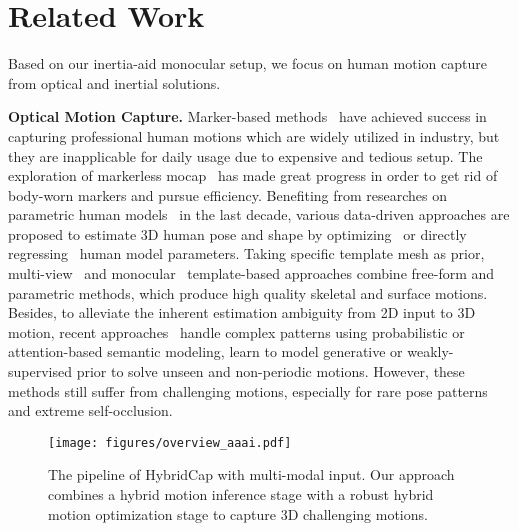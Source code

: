\documentclass[letterpaper]{article} \usepackage{aaai23}  \usepackage{times}  \usepackage{helvet}  \usepackage{courier}  \usepackage[hyphens]{url}  \usepackage{graphicx} \urlstyle{rm} \def\UrlFont{\rm}  \usepackage{natbib}  \usepackage{caption} \frenchspacing  \setlength{\pdfpagewidth}{8.5in}  \setlength{\pdfpageheight}{11in}  \usepackage{algorithm}
\newcommand{\myparagraph}[1]{\vspace{0.1em}\noindent\textbf{#1}}
\begin{document}
 \section{Related Work}


Based on our inertia-aid monocular setup, we focus on human motion capture from optical and inertial solutions.


\myparagraph{Optical Motion Capture.}
Marker-based methods~\cite{VICON,Vlasic2007} have achieved success in capturing professional human motions which are widely utilized in industry, but they are inapplicable for daily usage due to expensive and tedious setup. 
The exploration of markerless mocap~\cite{BreglM1998,AguiaSTAST2008,TheobASST2010} has made great progress in order to get rid of body-worn markers and pursue efficiency.
Benefiting from researches on parametric human models~\cite{SCAPE2005,SMPL2015,SMPLX2019,STAR_ECCV2020} in the last decade, various data-driven approaches are proposed to estimate 3D human pose and shape by optimizing~\cite{TAM_3DV2017,Lassner17,keepitSMPL,Kolotouros_2019_CVPR} or directly regressing~\cite{HMR18,Kanazawa_2019CVPR,VIBE_CVPR2020,zanfir2020neural} human model parameters. 
Taking specific template mesh as prior, multi-view~\cite{Gall2010,StollHGST2011,liu2013markerless,Robertini:2016,Pavlakos17,Simon17,FlyCap} and monocular~\cite{MonoPerfCap,LiveCap2019tog,EventCap_CVPR2020,DeepCap_CVPR2020} template-based approaches combine free-form and parametric methods, which produce high quality skeletal and surface motions.
Besides, to alleviate the inherent estimation ambiguity from 2D input to 3D motion, recent approaches~\cite{PHMR_ICCV2021,PARE_ICCV2021} handle complex patterns using probabilistic or attention-based semantic modeling, \cite{HUMOR_ICCV2021,challencap} learn to model generative or weakly-supervised prior to solve unseen and non-periodic motions. 
However, these methods still suffer from challenging motions, especially for rare pose patterns and extreme self-occlusion.



\begin{figure*}[t]
	\centering
	\texttt{[image: figures/overview\_aaai.pdf]}
	\caption{The pipeline of HybridCap with multi-modal input. Our approach combines a hybrid motion inference stage with a robust hybrid motion optimization stage to capture 3D challenging motions.  } 
	\label{fig:overview}
	\vspace{-3mm}
\end{figure*}
\end{document}
